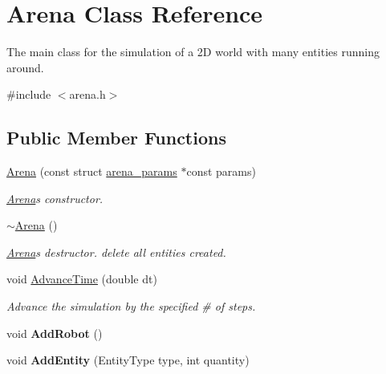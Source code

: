 \hypertarget{class_arena}{}\section{Arena Class Reference}
\label{class_arena}


The main class for the simulation of a 2D world with many entities running around.  




{\ttfamily \#include $<$arena.\+h$>$}

\subsection*{Public Member Functions}
\begin{DoxyCompactItemize}
\item 
\mbox{\hyperlink{class_arena_ac442d519facc5feebfd7612a53817e9a}{Arena}} (const struct \mbox{\hyperlink{structarena__params}{arena\+\_\+params}} $\ast$const params)
\begin{DoxyCompactList}\small\item\em \mbox{\hyperlink{class_arena}{Arena}}\textquotesingle{}s constructor. \end{DoxyCompactList}\item 
\mbox{\label{class_arena_ae21b399e9e3f6b8ac4ecc44d7d1667fc}} 
\mbox{\hyperlink{class_arena_ae21b399e9e3f6b8ac4ecc44d7d1667fc}{$\sim$\+Arena}} ()
\begin{DoxyCompactList}\small\item\em \mbox{\hyperlink{class_arena}{Arena}}\textquotesingle{}s destructor. {\ttfamily delete} all entities created. \end{DoxyCompactList}\item 
void \mbox{\hyperlink{class_arena_ad92d8b2e1593b652445e31d173977fc6}{Advance\+Time}} (double dt)
\begin{DoxyCompactList}\small\item\em Advance the simulation by the specified \# of steps. \end{DoxyCompactList}\item 
\mbox{\label{class_arena_a2573d164b44d0333d630f6f12a358320}} 
void {\bfseries Add\+Robot} ()
\item 
\mbox{\label{class_arena_a9e00ef1a079d49d648359952fcfaa9f3}} 
void {\bfseries Add\+Entity} (Entity\+Type type, int quantity)

\end{DoxyCompactItemize}
